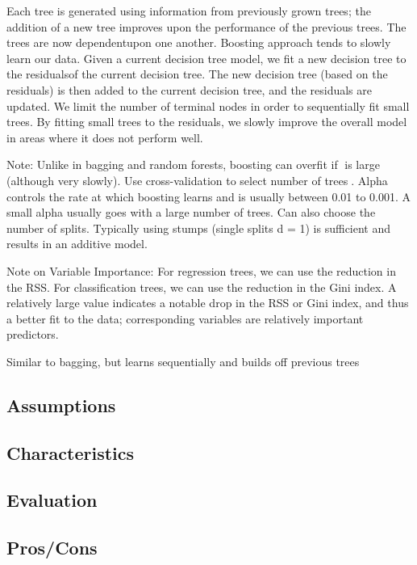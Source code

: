\documentclass[]{book}
\begin{document}
Each tree is generated using information from previously grown trees; the addition of a new tree improves upon the performance of the previous trees. The trees are now dependentupon one another. Boosting approach tends to slowly learn our data. Given a current decision tree model, we fit a new decision tree to the residualsof the current decision tree. The new decision tree (based on the residuals) is then added to the current decision tree, and the residuals are updated. We limit the number of terminal nodes in order to sequentially fit small trees. By fitting small trees to the residuals, we slowly improve the overall model in areas where it does not perform well.

Note: Unlike in bagging and random forests, boosting can overfit if ᫦is large (although very slowly). Use cross-validation to select number of trees᫦. Alpha controls the rate at which boosting learns and is usually between 0.01 to 0.001. A small alpha usually goes with a large number of trees. Can also choose the number of splits. Typically using stumps (single splits d = 1) is sufficient and results in an additive model.

Note on Variable Importance: For regression trees, we can use the reduction in the RSS. For classification trees, we can use the reduction in the Gini index. A relatively large value indicates a notable drop in the RSS or Gini index, and thus a better fit to the data; corresponding variables are relatively important predictors.

Similar to bagging, but learns sequentially and builds off previous trees

\hypertarget{assumptions-8}{%
\subsection{Assumptions}\label{assumptions-8}}

\hypertarget{characteristics-7}{%
\subsection{Characteristics}\label{characteristics-7}}

\hypertarget{evaluation-8}{%
\subsection{Evaluation}\label{evaluation-8}}

\hypertarget{proscons-8}{%
\subsection{Pros/Cons}\label{proscons-8}}
\end{document}
